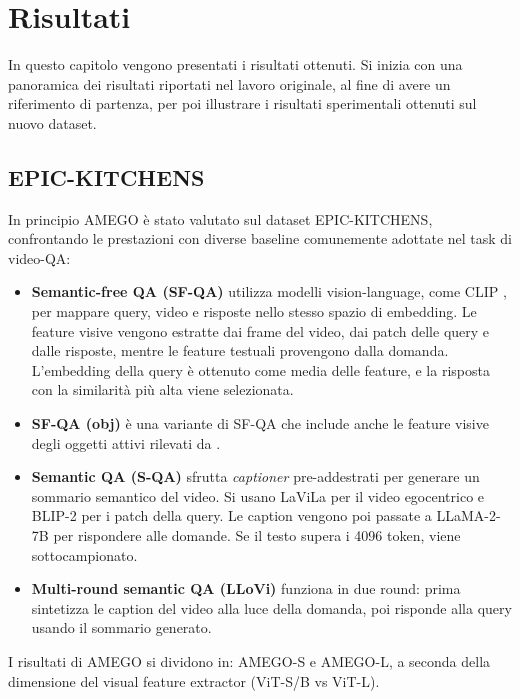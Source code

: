 \chapter{Risultati}
In questo capitolo vengono presentati i risultati ottenuti. Si inizia con una panoramica dei risultati riportati nel lavoro originale, al fine di avere un riferimento di partenza, per poi illustrare i risultati sperimentali ottenuti sul nuovo dataset.
\section{EPIC-KITCHENS}
In principio AMEGO è stato valutato sul dataset EPIC-KITCHENS, confrontando le prestazioni con diverse baseline comunemente adottate nel task di video-QA:
\begin{itemize}
    \item \textbf{Semantic-free QA (SF-QA)} utilizza modelli vision-language, come CLIP \cite{radford2021learningtransferablevisualmodels}, per mappare query, video e risposte nello stesso spazio di embedding. Le feature visive vengono estratte dai frame del video, dai patch delle query e dalle risposte, mentre le feature testuali provengono dalla domanda. L'embedding della query è ottenuto come media delle feature, e la risposta con la similarità più alta viene selezionata.
    
    \item \textbf{SF-QA (obj)} è una variante di SF-QA che include anche le feature visive degli oggetti attivi rilevati da \cite{shan2020understandinghumanhandscontact}.
    
    \item \textbf{Semantic QA (S-QA)} sfrutta \emph{captioner} pre-addestrati per generare un sommario semantico del video. Si usano LaViLa \cite{zhao2022learningvideorepresentationslarge} per il video egocentrico e BLIP-2 \cite{li2023blip2bootstrappinglanguageimagepretraining} per i patch della query. Le caption vengono poi passate a LLaMA-2-7B \cite{touvron2023llama2openfoundation} per rispondere alle domande. Se il testo supera i 4096 token, viene sottocampionato.
    
    \item \textbf{Multi-round semantic QA (LLoVi)} \cite{zhang2024simplellmframeworklongrange} funziona in due round: prima sintetizza le caption del video alla luce della domanda, poi risponde alla query usando il sommario generato.
\end{itemize}

I risultati di AMEGO si dividono in: AMEGO-S e AMEGO-L, a seconda della dimensione del visual feature extractor (ViT-S/B vs ViT-L).

